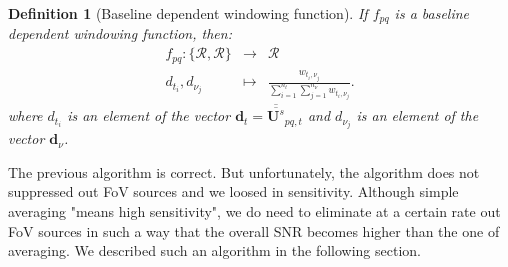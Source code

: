\documentclass[useAMS,usenatbib]{mn2e}
\newtheorem{definition}[theorem]{Definition}
\begin{document}
\begin{definition}[Baseline dependent windowing function]
\label{def:3}
If $f_{pq}$ is a \textit{baseline dependent windowing function}, then:
\begin{eqnarray*}
 f_{pq}: \{\mathbf{\mathcal{R}},\mathbf{\mathcal{R}}\} &\rightarrow& \mathbf{\mathcal{R}}\\
                   d_{t_i},d_{\nu_j} &\mapsto& \frac{w_{t_i,\nu_j}}{\sum_{i=1}^{n_t}\sum_{j=1}^{n_{\nu}}w_{t_i,\nu_j}}.
\end{eqnarray*}
where $d_{t_i}$ is an element of the vector $\mathbf{d}_{t}=\overline{\overline{\mathbf{U}^{s}}}_{pq,t}$ and $d_{\nu_j}$ is an element 
of the vector $\mathbf{d}^{}_{\nu}$.
\end{definition}
The previous algorithm is correct. But unfortunately, the algorithm does not suppressed out FoV sources and we loosed  in sensitivity. 
Although simple averaging "means high sensitivity", we do need to eliminate at a certain rate out FoV sources in such a way that the 
overall SNR becomes higher than the one of averaging. We described such an algorithm in the following section.
\end{document}
